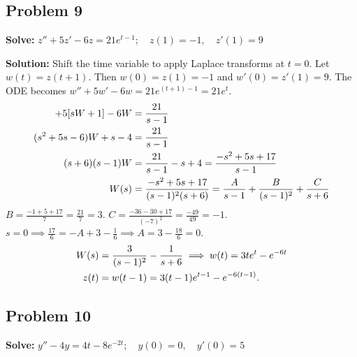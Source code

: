 \documentclass[11pt, letterpaper]{article}
\theoremstyle{definition}
\theoremstyle{remark}
\begin{document}
\subsection*{Problem 9}
\textbf{Solve:} $z'' + 5z' - 6z = 21e^{t-1} ; \quad z(1) = -1 , \quad z'(1) = 9$

\textbf{Solution:}
Shift the time variable to apply Laplace transforms at $t=0$. Let $w(t) = z(t+1)$.
Then $w(0) = z(1) = -1$ and $w'(0) = z'(1) = 9$.
The ODE becomes $w'' + 5w' - 6w = 21e^{(t+1)-1} = 21e^t$.
\begin{align*}
[s^2 W + s - 9] + 5[s W + 1] - 6W &= \frac{21}{s - 1} \\ \relax
(s^2 + 5s - 6)W + s - 4 &= \frac{21}{s - 1} \\ \relax
(s + 6)(s - 1)W &= \frac{21}{s - 1} - s + 4 = \frac{-s^2 + 5s + 17}{s - 1} \\ \relax
W(s) &= \frac{-s^2 + 5s + 17}{(s - 1)^2(s + 6)} = \frac{A}{s - 1} + \frac{B}{(s - 1)^2} + \frac{C}{s + 6}
\end{align*}
$B = \frac{-1 + 5 + 17}{7} = \frac{21}{7} = 3$.
$C = \frac{-36 - 30 + 17}{(-7)^2} = \frac{-49}{49} = -1$.
$s=0 \implies \frac{17}{6} = -A + 3 - \frac{1}{6} \implies A = 3 - \frac{18}{6} = 0$.
\begin{align*}
W(s) &= \frac{3}{(s - 1)^2} - \frac{1}{s + 6} \implies w(t) = 3te^t - e^{-6t} \\ \relax
z(t) &= w(t - 1) = 3(t - 1)e^{t - 1} - e^{-6(t - 1)}.
\end{align*}

\subsection*{Problem 10}
\textbf{Solve:} $y'' - 4y = 4t - 8e^{-2t} ; \quad y(0) = 0 , \quad y'(0) = 5$
\end{document}

